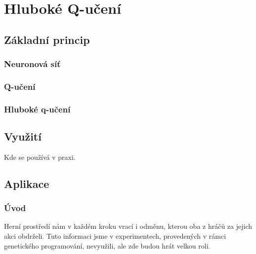 \chapter{Hluboké Q-učení}

\section{Základní princip}
\subsection{Neuronová síť}

\subsection{Q-učení}
\subsection{Hluboké q-učení}

\section{Využití}
Kde se používá v praxi.


\section{Aplikace}
\subsection{Úvod}
Herní prostředí nám v každém kroku vrací i odměnu, kterou oba z hráčů za jejich akci obdrželi. Tuto informaci jsme v experimentech, provedených v rámci genetického programování, nevyužili, ale zde budou hrát velkou roli.

